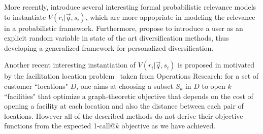 More recently, \cite{Vargas:SIGIR2012} introduce several interesting formal probabilistic
relevance models to instantiate $V(r_i| \vec{q}, s_i)$, which are more
appopriate in modeling the relevance in a probabilistic
framework. Furthermore, \cite{Vallet:SIGIR2012} propose to introduce a
user as an explicit random variable in state of the art
diversification methods, thus developing a generalized framework for
personalized diversification.

Another recent interesting instantiation of $V(r_i|\vec{q},s_i)$ is proposed
in \cite{Zuccon:ECIR2012} motivated by the facilitation location
problem~\cite{Gonzalez:Handbook2007} taken from Operations Research:
for a set of customer ``locations" $D$, one aims at choosing a subset
$S_k$ in $D$ to open $k$ ``facilities" that optimize a graph-theoretic
objective that depends on the cost of opening a facility at each
location and also the distance between each pair of locations. However
all of the described methods do not derive their objective
functions from the expected 1-call@$k$ objective as we have achieved.


